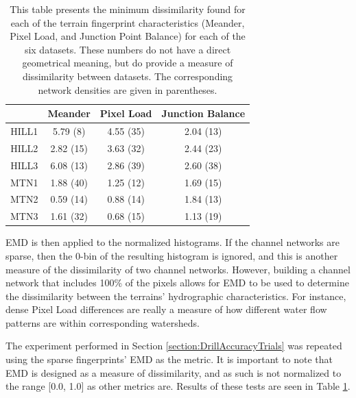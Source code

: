 \begin{table}[t]
  \centering
  \caption[Minimum dissimilarity values in tests for different terrain fingerprint characteristics]{\label{table:FingerprintMetrics} This table presents the minimum dissimilarity found for each of the terrain fingerprint characteristics (Meander, Pixel Load, and Junction Point Balance) for each of the six datasets. These numbers do not have a direct geometrical meaning, but do provide a measure of dissimilarity between datasets. The corresponding network densities are given in parentheses.}
  \begin{tabular}{ | c | c | c | c | }
    \hline
      & \textbf{Meander} & \textbf{Pixel Load} & \textbf{Junction Balance} \\
    \hline
    HILL1 & 5.79 (8) & 4.55 (35) & 2.04 (13) \\ 
    HILL2 & 2.82 (15) & 3.63 (32) & 2.44 (23) \\ 
    HILL3 & 6.08 (13) & 2.86 (39) & 2.60 (38) \\
    MTN1 & 1.88 (40) & 1.25 (12) & 1.69 (15) \\
    MTN2 & 0.59 (14) & 0.88 (14) & 1.84 (13) \\
    MTN3 & 1.61 (32) & 0.68 (15) & 1.13 (19) \\
    \hline
  \end{tabular}
\end{table}



EMD is then applied to the normalized histograms.
If the channel networks are sparse, then the 0-bin of the resulting histogram is ignored, and this is another measure of the dissimilarity of two channel networks. However, building a channel network that includes 100\% of the pixels allows for EMD to be used to determine the dissimilarity between the terrains' hydrographic characteristics. For instance, dense Pixel Load differences are really a measure of how different water flow patterns are within corresponding watersheds.

The experiment performed in Section \ref{section:DrillAccuracyTrials} was repeated using the sparse fingerprints' EMD as the metric. It is important to note that EMD is designed as a measure of dissimilarity, and as such is not normalized to the range [0.0, 1.0] as other metrics are. Results of these tests are seen in Table \ref{table:FingerprintMetrics}.

